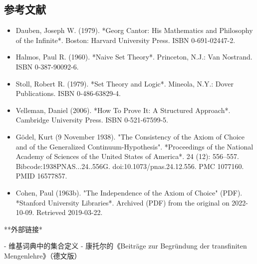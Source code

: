 \subsection{参考文献}
\begin{itemize}
\item Dauben, Joseph W. (1979). *Georg Cantor: His Mathematics and Philosophy of the Infinite*. Boston: Harvard University Press. ISBN 0-691-02447-2.  
\item Halmos, Paul R. (1960). *Naive Set Theory*. Princeton, N.J.: Van Nostrand. ISBN 0-387-90092-6.  
\item Stoll, Robert R. (1979). *Set Theory and Logic*. Mineola, N.Y.: Dover Publications. ISBN 0-486-63829-4.  
\item Velleman, Daniel (2006). *How To Prove It: A Structured Approach*. Cambridge University Press. ISBN 0-521-67599-5.  
\item Gödel, Kurt (9 November 1938). "The Consistency of the Axiom of Choice and of the Generalized Continuum-Hypothesis". *Proceedings of the National Academy of Sciences of the United States of America*. 24 (12): 556–557. Bibcode:1938PNAS...24..556G. doi:10.1073/pnas.24.12.556. PMC 1077160. PMID 16577857.  
\item Cohen, Paul (1963b). "The Independence of the Axiom of Choice" (PDF). *Stanford University Libraries*. Archived (PDF) from the original on 2022-10-09. Retrieved 2019-03-22.
\end{itemize}
**外部链接*

- 维基词典中的集合定义  
- 康托尔的《Beiträge zur Begründung der transfiniten Mengenlehre》（德文版）
